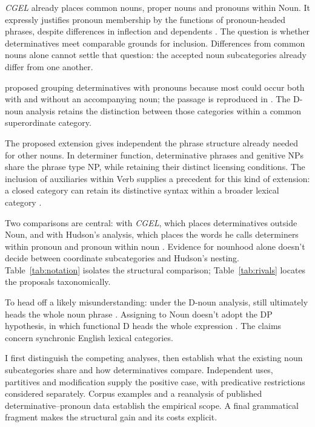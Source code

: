 \documentclass[12pt]{article}
\begin{document}
\textit{CGEL} already places common nouns, proper nouns and pronouns within Noun. It expressly justifies pronoun membership by the functions of pronoun-headed phrases, despite differences in inflection and dependents \citep[327--328]{huddleston2002}. The question is whether determinatives meet comparable grounds for inclusion. Differences from common nouns alone cannot settle that question: the accepted noun subcategories already differ from one another.

\textcite[24]{palmer1924} proposed grouping determinatives with pronouns because most could occur both with and without an accompanying noun; the passage is reproduced in \textcite[3]{reynolds2013determiners}. The D-noun analysis retains the distinction between those categories within a common superordinate category.

The proposed extension gives independent  the phrase structure already needed for other nouns. In determiner function, determinative phrases and genitive NPs share the phrase type NP, while retaining their distinct licensing conditions. The inclusion of auxiliaries within Verb supplies a precedent for this kind of extension: a closed category can retain its distinctive syntax within a broader lexical category \citep{pullumwilson1977}.

Two comparisons are central: with \textit{CGEL}, which places determinatives outside Noun, and with Hudson's analysis, which places the words he calls determiners within pronoun and pronoun within noun \citep{hudson2004determiners,hudson2010wordgrammar}. Evidence for nounhood alone doesn't decide between coordinate subcategories and Hudson's nesting. Table~\ref{tab:notation} isolates the structural comparison; Table~\ref{tab:rivals} locates the proposals taxonomically.

To head off a likely misunderstanding: under the D-noun analysis,  still ultimately heads the whole noun phrase . Assigning  to Noun doesn't adopt the DP hypothesis, in which functional D heads the whole expression \citep{abney1987}. The claims concern synchronic English lexical categories.

I first distinguish the competing analyses, then establish what the existing noun subcategories share and how determinatives compare. Independent uses, partitives and modification supply the positive case, with predicative restrictions considered separately. Corpus examples and a reanalysis of published determinative--pronoun data establish the empirical scope. A final grammatical fragment makes the structural gain and its costs explicit.
\end{document}
